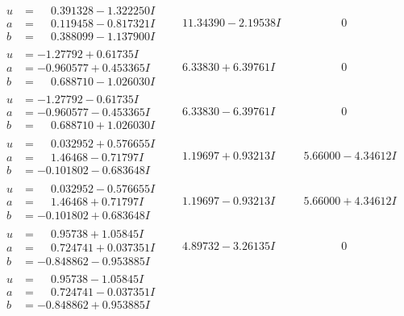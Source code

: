 \documentclass[1p]{elsarticle_modified}
\theoremstyle{definition}
\begin{document}
$$\begin{array}{c|c|c}
\begin{aligned}
u &= \phantom{-}0.391328 - 1.322250 I \\
a &= \phantom{-}0.119458 - 0.817321 I \\
b &= \phantom{-}0.388099 - 1.137900 I\end{aligned}
 & \phantom{-}11.34390 - 2.19538 I & \phantom{-0.000000 } 0 \\ \hline\begin{aligned}
u &= -1.27792 + 0.61735 I \\
a &= -0.960577 + 0.453365 I \\
b &= \phantom{-}0.688710 - 1.026030 I\end{aligned}
 & \phantom{-}6.33830 + 6.39761 I & \phantom{-0.000000 } 0 \\ \hline\begin{aligned}
u &= -1.27792 - 0.61735 I \\
a &= -0.960577 - 0.453365 I \\
b &= \phantom{-}0.688710 + 1.026030 I\end{aligned}
 & \phantom{-}6.33830 - 6.39761 I & \phantom{-0.000000 } 0 \\ \hline\begin{aligned}
u &= \phantom{-}0.032952 + 0.576655 I \\
a &= \phantom{-}1.46468 - 0.71797 I \\
b &= -0.101802 - 0.683648 I\end{aligned}
 & \phantom{-}1.19697 + 0.93213 I & \phantom{-}5.66000 - 4.34612 I \\ \hline\begin{aligned}
u &= \phantom{-}0.032952 - 0.576655 I \\
a &= \phantom{-}1.46468 + 0.71797 I \\
b &= -0.101802 + 0.683648 I\end{aligned}
 & \phantom{-}1.19697 - 0.93213 I & \phantom{-}5.66000 + 4.34612 I \\ \hline\begin{aligned}
u &= \phantom{-}0.95738 + 1.05845 I \\
a &= \phantom{-}0.724741 + 0.037351 I \\
b &= -0.848862 - 0.953885 I\end{aligned}
 & \phantom{-}4.89732 - 3.26135 I & \phantom{-0.000000 } 0 \\ \hline\begin{aligned}
u &= \phantom{-}0.95738 - 1.05845 I \\
a &= \phantom{-}0.724741 - 0.037351 I \\
b &= -0.848862 + 0.953885 I\end{aligned}

\end{array}$$
\end{document}
